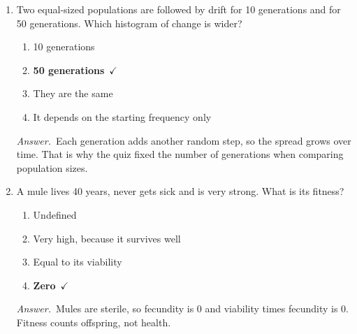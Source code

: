 \documentclass[11pt]{article}
\newcommand{\keyans}[1]{\par\medskip\noindent\textit{Answer.}\ #1\par\medskip}
\begin{document}
\begin{enumerate}[label=\textbf{\arabic*.}, leftmargin=2em, itemsep=1.4em]
\begin{tabularx}{\linewidth}{@{}YY@{}}
\end{tabularx}
\keyans{Every term on top and the \(\overline{W}\) on the bottom are divided by the same 6, so it cancels. Problem Set 12 question 7c says either works.}
\item Two equal-sized populations are followed by drift for 10 generations and for 50 generations. Which histogram of change is wider?
\nopagebreak\par{}
\par\smallskip
\begin{enumerate}[label={}, leftmargin=2.4em, labelwidth=0pt, itemsep=2pt, topsep=0pt]
\item \hspace*{-2.4em}10 generations
\item \hspace*{-2.4em}\textbf{50 generations}\ \(\checkmark\)
\item \hspace*{-2.4em}They are the same
\item \hspace*{-2.4em}It depends on the starting frequency only
\end{enumerate}
\keyans{Each generation adds another random step, so the spread grows over time. That is why the quiz fixed the number of generations when comparing population sizes.}
\item A mule lives 40 years, never gets sick and is very strong. What is its fitness?
\nopagebreak\par{}
\par\smallskip
\begin{enumerate}[label={}, leftmargin=2.4em, labelwidth=0pt, itemsep=2pt, topsep=0pt]
\item \hspace*{-2.4em}Undefined
\item \hspace*{-2.4em}Very high, because it survives well
\item \hspace*{-2.4em}Equal to its viability
\item \hspace*{-2.4em}\textbf{Zero}\ \(\checkmark\)
\end{enumerate}
\keyans{Mules are sterile, so fecundity is 0 and viability times fecundity is 0. Fitness counts offspring, not health.}
\end{enumerate}
\end{document}
